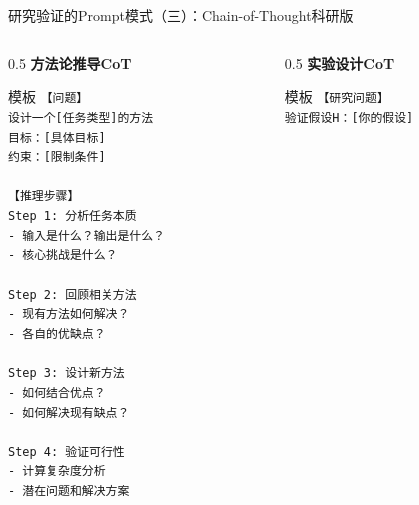 \documentclass[aspectratio=169,11pt]{beamer}
\begin{document}
\begin{frame}[fragile]{研究验证的Prompt模式（三）：Chain-of-Thought科研版}
    \begin{columns}
        \begin{column}{0.5\textwidth}
            \textbf{方法论推导CoT}
            \begin{exampleblock}{模板}
                \scriptsize
                \texttt{【问题】}\\
                \texttt{设计一个[任务类型]的方法}\\
                \texttt{目标：[具体目标]}\\
                \texttt{约束：[限制条件]}\\
                \texttt{}\\
                \texttt{【推理步骤】}\\
                \texttt{Step 1: 分析任务本质}\\
                \texttt{- 输入是什么？输出是什么？}\\
                \texttt{- 核心挑战是什么？}\\
                \texttt{}\\
                \texttt{Step 2: 回顾相关方法}\\
                \texttt{- 现有方法如何解决？}\\
                \texttt{- 各自的优缺点？}\\
                \texttt{}\\
                \texttt{Step 3: 设计新方法}\\
                \texttt{- 如何结合优点？}\\
                \texttt{- 如何解决现有缺点？}\\
                \texttt{}\\
                \texttt{Step 4: 验证可行性}\\
                \texttt{- 计算复杂度分析}\\
                \texttt{- 潜在问题和解决方案}
            \end{exampleblock}
        \end{column}
        \begin{column}{0.5\textwidth}
            \textbf{实验设计CoT}
            \begin{exampleblock}{模板}
                \scriptsize
                \texttt{【研究问题】}\\
                \texttt{验证假设H：[你的假设]}\\

\end{exampleblock}
\end{column}
\end{columns}
\end{frame}
\end{document}
